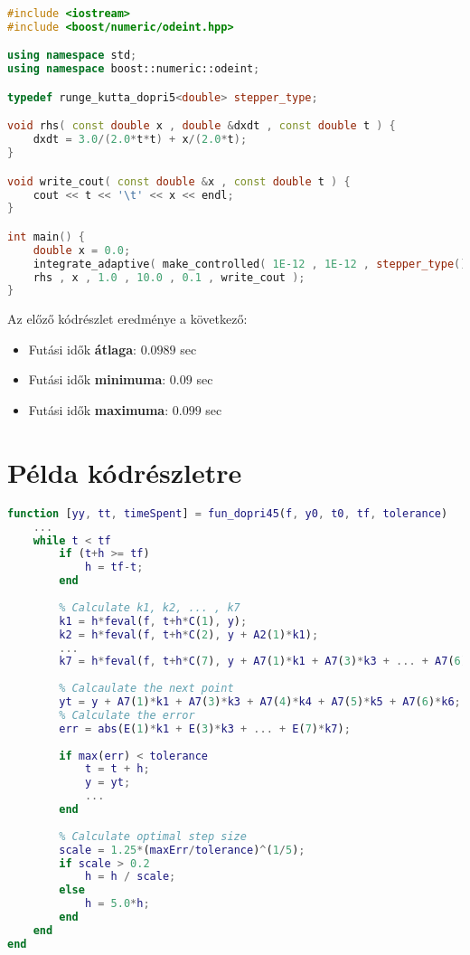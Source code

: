 \begin{lstlisting}[caption={Odeint példakód.}, captionpos=b, language = C++]
#include <iostream>
#include <boost/numeric/odeint.hpp>

using namespace std;
using namespace boost::numeric::odeint;

typedef runge_kutta_dopri5<double> stepper_type;

void rhs( const double x , double &dxdt , const double t ) {
	dxdt = 3.0/(2.0*t*t) + x/(2.0*t);
}

void write_cout( const double &x , const double t ) {
	cout << t << '\t' << x << endl;
}

int main() {
	double x = 0.0;    
	integrate_adaptive( make_controlled( 1E-12 , 1E-12 , stepper_type() ) ,
	rhs , x , 1.0 , 10.0 , 0.1 , write_cout );
}
\end{lstlisting}
\pagebreak
Az előző kódrészlet eredménye a következő:



\begin{itemize}
	\item Futási idők \textbf{átlaga}: $ 0.0989 $ sec
	\item Futási idők \textbf{minimuma}: $ 0.09 $ sec
	\item Futási idők \textbf{maximuma}: $ 0.099 $ sec
\end{itemize}

\section {P\'elda k\'odr\'eszletre} \label{fejezet3_2}

\begin{lstlisting}[caption={Matlab kód ode45 használata nélkül.}, captionpos=b, language = Matlab]
function [yy, tt, timeSpent] = fun_dopri45(f, y0, t0, tf, tolerance)
	...
	while t < tf
		if (t+h >= tf)
			h = tf-t;
		end
		
		% Calculate k1, k2, ... , k7
		k1 = h*feval(f, t+h*C(1), y);
		k2 = h*feval(f, t+h*C(2), y + A2(1)*k1);
		...
		k7 = h*feval(f, t+h*C(7), y + A7(1)*k1 + A7(3)*k3 + ... + A7(6)*k6);
		
		% Calcaulate the next point
		yt = y + A7(1)*k1 + A7(3)*k3 + A7(4)*k4 + A7(5)*k5 + A7(6)*k6;
		% Calculate the error
		err = abs(E(1)*k1 + E(3)*k3 + ... + E(7)*k7);
		
		if max(err) < tolerance
			t = t + h;
			y = yt;
			...
		end
		
		% Calculate optimal step size
		scale = 1.25*(maxErr/tolerance)^(1/5);
		if scale > 0.2
			h = h / scale;
		else
			h = 5.0*h;
		end
	end
end
\end{lstlisting}




